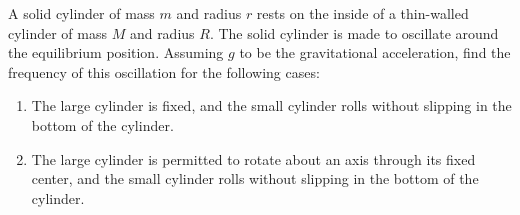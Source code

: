 \documentclass[11pt]{scrartcl}
\begin{document}
\begin{example}
A solid cylinder of mass $m$ and radius $r$ rests on the inside of a thin-walled cylinder of mass $M$ and radius $R.$ The solid cylinder is made to oscillate around the equilibrium position. Assuming $g$ to be the gravitational acceleration, find the frequency of this oscillation for the following cases:
\begin{enumerate}
\item The large cylinder is fixed, and the small cylinder rolls without slipping in the bottom of the cylinder.
\item The large cylinder is permitted to rotate about an axis through its fixed center, and the small cylinder rolls without slipping in the bottom of the cylinder.
\end{enumerate}
\end{example}
\end{document}
